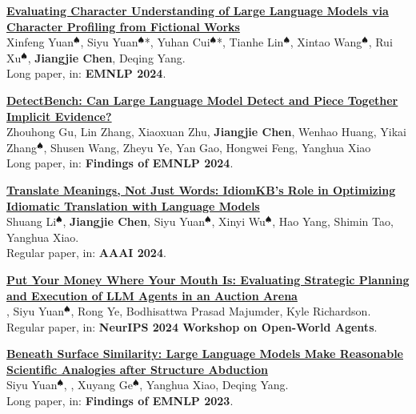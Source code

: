 \documentclass{resume}
\begin{document}
\begin{enumerate}[label={[\arabic*]}]
  \item \textbf{\href{https://arxiv.org/pdf/2404.12726.pdf}{Evaluating Character Understanding of Large Language Models via Character Profiling from Fictional Works}}\\
  \label{paper:persona}
  Xinfeng Yuan$^\spadesuit$, Siyu Yuan$^\spadesuit$*, Yuhan Cui$^\spadesuit$*, Tianhe Lin$^\spadesuit$, Xintao Wang$^\spadesuit$, Rui Xu$^\spadesuit$, \textbf{Jiangjie Chen}, Deqing Yang.\\
  Long paper, in: \textbf{EMNLP 2024}.

  \item \textbf{\href{https://jiangjiechen.github.io/publication/detectbench}{DetectBench: Can Large Language Model Detect and Piece Together Implicit Evidence?}}\\
  \label{paper:detectbench}
  Zhouhong Gu, Lin Zhang, Xiaoxuan Zhu, \textbf{Jiangjie Chen}, Wenhao Huang, Yikai Zhang$^\spadesuit$, Shusen Wang, Zheyu Ye, Yan Gao, Hongwei Feng, Yanghua Xiao\\
  Long paper, in: \textbf{Findings of EMNLP 2024}.
  
  \item \textbf{\href{https://jiangjiechen.github.io/publication/idiomkb}{Translate Meanings, Not Just Words: IdiomKB's Role in Optimizing Idiomatic Translation with Language Models}}\\
  \label{paper:idiomkb}
  Shuang Li$^\spadesuit$, \textbf{Jiangjie Chen}, Siyu Yuan$^\spadesuit$, Xinyi Wu$^\spadesuit$, Hao Yang, Shimin Tao, Yanghua Xiao.\\
  Regular paper, in: \textbf{AAAI 2024}.

  \item \textbf{\href{https://auction-arena.github.io}{Put Your Money Where Your Mouth Is: Evaluating Strategic Planning and Execution of LLM Agents in an Auction Arena}}\\
  \label{paper:auction}
  \textbf{\color{black}{Jiangjie Chen}}, Siyu Yuan$^\spadesuit$, Rong Ye, Bodhisattwa Prasad Majumder, Kyle Richardson.\\
  Regular paper, in: \textbf{NeurIPS 2024 Workshop on Open-World Agents}.
  
  \item \textbf{\href{https://jiangjiechen.github.io/publication/scar/}{Beneath Surface Similarity: Large Language Models Make Reasonable Scientific Analogies after Structure Abduction}}\\
  \label{paper:scar}
  Siyu Yuan$^\spadesuit$, \textbf{\color{black}{Jiangjie Chen}}, Xuyang Ge$^\spadesuit$, Yanghua Xiao, Deqing Yang.\\
  Long paper, in: \textbf{Findings of EMNLP 2023}.
  

\end{enumerate}
\end{document}
